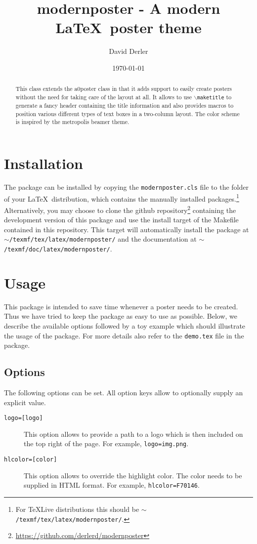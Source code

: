 \documentclass{article}
\title{modernposter - A modern \LaTeX~poster theme}
\author{David Derler}
\date{\today}
\begin{document}
  \maketitle

  \begin{abstract}
\noindent This class extends the a0poster class in that it adds support to easily create posters without the need for taking care of the layout at all. It allows to use {\tt $\backslash$maketitle} to generate a fancy header containing the title information and also provides macros to position various different types of text boxes in a two-column layout. The color scheme  is inspired by the metropolis beamer theme.
  \end{abstract}
  \section{Installation}
  The package can be installed by copying the {\tt modernposter.cls} file to the folder of your \LaTeX~distribution, which contains the manually installed packages.\footnote{For TeXLive distributions this should be {\tt $\sim$/texmf/tex/latex/modernposter/}.} Alternatively, you may choose to clone the github repository\footnote{\url{https://github.com/derlerd/modernposter}} containing the development version of this package and use the install target of the Makefile contained in this repository. This target will automatically install the package at {\tt $\sim$/texmf/tex/latex/modern\-poster/} and the documentation at {\tt $\sim$/texmf/doc/latex/modernposter/}.
  \section{Usage}
  This package is intended to save time whenever a poster needs to be created. Thus we have tried to keep the package as easy to use as possible. Below, we describe the available options followed by a toy example which should illustrate the usage of the package. For more details also refer to the {\tt demo.tex} file in the package.
  \subsection{Options}
  The following options can be set. All option keys allow to optionally supply an explicit value.  
  \begin{description}
  	\item[{\tt logo=[logo]}] This option allows to provide a path to a logo which is then included on the top right of the page. For example, {\tt logo=img.png}.
  	\item[{\tt hlcolor=[color]}] This option allows to override the highlight color. The color needs to be supplied in HTML format. For example, {\tt hlcolor=F70146}. 
  \end{description}
\end{document}
